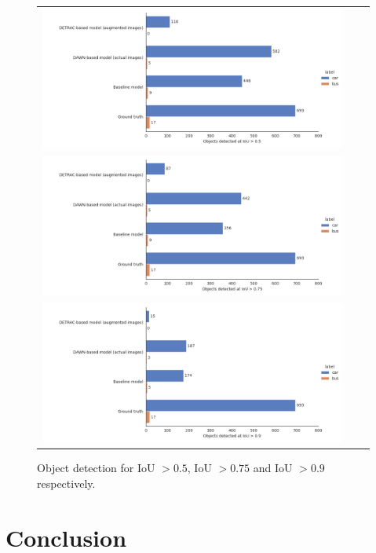 \documentclass[]{article}
\begin{document}
	\begin{figure}[H]
	\centering
	\begin{tabular}{ccc}
		\includegraphics[width=120mm]{object_prediction_iou_0.5.png} \\ \includegraphics[width=120mm]{object_prediction_iou_0.75.png} \\ \includegraphics[width=120mm]{object_prediction_iou_0.9.png}
	\end{tabular}
	\caption{Object detection for IoU $ > 0.5$, IoU $ > 0.75$ and IoU $ > 0.9$ respectively.}
	\label{fig:iou-thresholds}
	\end{figure}

\section{Conclusion}
\end{document}
